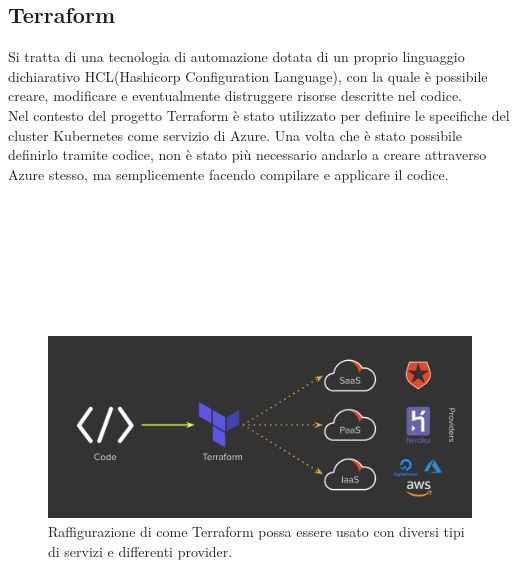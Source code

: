 \documentclass[a4paper,12pt]{report}
\begin{document}
\subsection{Terraform}
Si tratta di una tecnologia di automazione dotata di un proprio linguaggio dichiarativo HCL(Hashicorp Configuration Language), con la quale è possibile creare, modificare e eventualmente distruggere risorse descritte nel codice.\\
Nel contesto del progetto Terraform è stato utilizzato per definire le specifiche del cluster Kubernetes come servizio di Azure. Una volta che è stato possibile definirlo tramite codice, non è stato più necessario andarlo a creare attraverso Azure stesso, ma semplicemente facendo compilare e applicare il codice. \\ \\ \\ \\ \\ \\ \\ \\
\begin{figure}[h]
	\includegraphics[width=1.0\textwidth]{terraform}
    \caption{Raffigurazione di come Terraform possa essere usato con diversi tipi di servizi e differenti provider. \cite{terraformimg}}
    \label{fig:terraform}
\end{figure}
\end{document}
